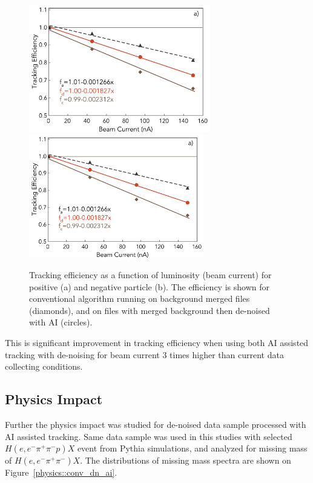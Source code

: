 \begin{figure}[!h]
\begin{center}
 \includegraphics[width=3.1in]{images/figure_lscan_pos_ai.pdf}
 \includegraphics[width=3in]{images/figure_lscan_pos_ai.pdf}
\caption {Tracking efficiency as a function of luminosity (beam current) for positive (a) and negative particle (b).  The efficiency is shown for
conventional algorithm running on background merged files (diamonds), and on files with merged background then de-noised with AI (circles).}
 \label{lscan::conv_dn_ai}
 \end{center}
\end{figure}

This is significant improvement in tracking efficiency when using both AI assisted tracking with de-noising for beam current 3 times higher than current data collecting conditions.

\subsection{Physics Impact}

Further the physics impact was studied for de-noised data sample processed with AI assisted tracking. Same data sample was used in this studies with selected $H(e,e^-\pi^+\pi^-p)X$ event from Pythia simulations, and analyzed for
missing mass of $H(e,e^-\pi^+\pi^-)X$. The distributions of missing mass spectra are shown on Figure~\ref{physics::conv_dn_ai}.

